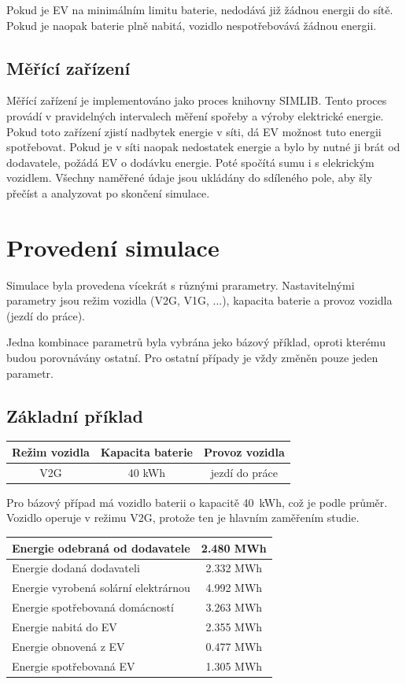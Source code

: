 \documentclass[12pt,a4paper]{article}
\begin{document}
Pokud je EV na minimálním limitu baterie, nedodává již žádnou energii do sítě.
Pokud je naopak baterie plně nabitá, vozidlo nespotřebovává žádnou energii.

\subsection{Měřící zařízení}
Měřící zařízení je implementováno jako proces knihovny SIMLIB.
Tento proces provádí v pravidelných intervalech měření spořeby a výroby elektrické energie.
Pokud toto zařízení zjistí nadbytek energie v síti, dá EV možnost tuto energii spotřebovat.
Pokud je v síti naopak nedostatek energie a bylo by nutné ji brát od dodavatele, požádá EV o dodávku energie.
Poté spočítá sumu i s elekrickým vozidlem.
Všechny naměřené údaje jsou ukládány do sdíleného pole, aby šly přečíst a analyzovat po skončení simulace.

\newpage

\section{Provedení simulace}

Simulace byla provedena vícekrát s různými prarametry.
Nastavitelnými parametry jsou režim vozidla (V2G, V1G, ...), kapacita baterie a provoz vozidla (jezdí do práce).

Jedna kombinace parametrů byla vybrána jeko bázový příklad,
oproti kterému budou porovnávány ostatní.
Pro ostatní případy je vždy změněn pouze jeden parametr.

\subsection{Základní příklad}

\bigskip
\begin{tabular}{ | c | c | c | }
\hline
Režim vozidla & Kapacita baterie & Provoz vozidla \\
\hline
V2G & 40 kWh & jezdí do práce \\
\hline
\end{tabular}
\bigskip

Pro bázový případ má vozidlo baterii o kapacitě 40~kWh, což je podle \textcite{} průměr.
Vozidlo operuje v režimu V2G, protože ten je hlavním zaměřením studie.

\bigskip
\begin{tabular}{ | l | c | }
\hline
Energie odebraná od dodavatele & 2.480 MWh \\
\hline
Energie dodaná dodavateli & 2.332 MWh \\
\hline
Energie vyrobená solární elektrárnou & 4.992 MWh \\
\hline
Energie spotřebovaná domácností & 3.263 MWh \\
\hline
Energie nabitá do EV & 2.355 MWh \\
\hline
Energie obnovená z EV & 0.477 MWh \\
\hline
Energie spotřebovaná EV & 1.305 MWh \\
\hline
\end{tabular}
\bigskip
\end{document}
